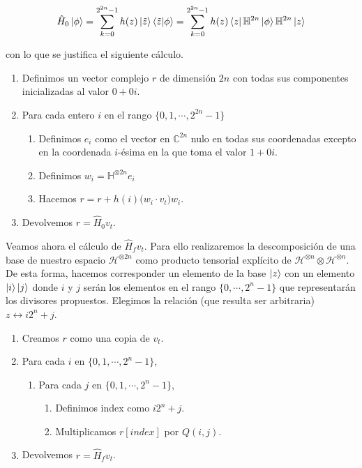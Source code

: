 \documentclass[11pt, spanish]{report}
\numberwithin{equation}{section}
\numberwithin{defin}{section}
\begin{document}
\begin{equation}
\hat{H}_0\ket{\phi}=\sum_{k=0}^{2^{2n}-1}h(z)\ket{\tilde{z}}\bra{\tilde{z}}\ket{\phi}=\sum_{k=0}^{2^{2n}-1}h(z)\bra{z}\mathbb{H}^{2n}\ket{\phi}\mathbb{H}^{2n}\ket{z}
\end{equation}

con lo que se justifica el siguiente cálculo.

\begin{enumerate}
\item Definimos un vector complejo $r$ de dimensión $2n$ con todas sus componentes inicializadas al valor $0+0i$.
\item Para cada entero $i$ en el rango $\{0,1,\cdots, 2^{2n}-1\}$
\begin{enumerate}
\item Definimos $e_i$ como el vector en $\mathbb{C}^{2n}$ nulo en todas sus coordenadas excepto en la coordenada $i$-ésima en la que toma el valor $1+0i$.
\item Definimos $w_i=\mathbb{H}^{\otimes 2n}e_i$
\item Hacemos $r=r+h(i)\Big(w_i\cdot v_t\Big)w_i$.
\end{enumerate}
\item Devolvemos $r=\hat{H}_0v_t$.
\end{enumerate}

Veamos ahora el cálculo de $\hat{H}_fv_t$. Para ello realizaremos la descomposición de una base de nuestro espacio $\mathcal{H}^{\otimes 2n}$ como producto tensorial explícito de $\mathcal{H}^{\otimes n}\otimes \mathcal{H}^{\otimes n}$. De esta forma, hacemos corresponder un elemento de la base $\ket{z}$ con un elemento $\ket{i}\ket{j}$ donde $i$ y $j$ serán los elementos en el rango $\{0,\cdots,2^n-1\}$ que representarán los divisores propuestos. Elegimos la relación (que resulta ser arbitraria) $z\leftrightarrow i2^n+j$.

\begin{enumerate}
\item Creamos $r$ como una copia de $v_t$.
\item Para cada $i$ en $\{0,1,\cdots,2^n-1\}$,
\begin{enumerate}
\item Para cada $j$ en $\{0,1,\cdots,2^n-1\}$,
\begin{enumerate}
\item Definimos index como $i2^n+j$.
\item Multiplicamos $r[index]$ por $Q(i,j)$.
\end{enumerate}
\end{enumerate}
\item Devolvemos $r=\hat{H}_fv_t$.
\end{enumerate}
\end{document}
